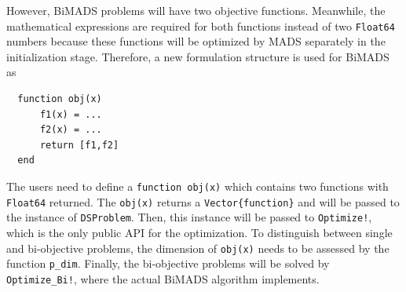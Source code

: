 \documentclass[11pt,oneside,onecolumn,openright]{article}
\begin{document}
  However, BiMADS problems will have two objective functions. Meanwhile, the mathematical expressions are required for both functions instead of two \verb|Float64| numbers because these functions will be optimized by MADS separately in the initialization stage. Therefore, a new formulation structure is used for BiMADS as
  \begin{verbatim}
  function obj(x)
      f1(x) = ...
      f2(x) = ...
      return [f1,f2]
  end
  \end{verbatim}
  The users need to define a \verb|function obj(x)| which contains two functions with \verb|Float64| returned. The \verb|obj(x)| returns a \verb|Vector{function}| and will be passed to the instance of \verb|DSProblem|. Then, this instance will be passed to \verb|Optimize!|, which is the only public API for the optimization. To distinguish between single and bi-objective problems, the dimension of \verb|obj(x)| needs to be assessed by the function \verb|p_dim|. Finally, the bi-objective problems will be solved by \verb|Optimize_Bi!|, where the actual BiMADS algorithm implements.
\end{document}
